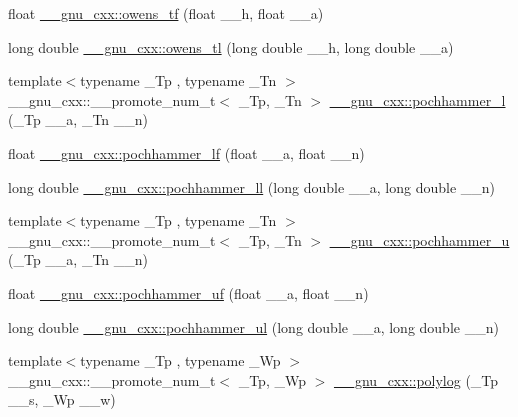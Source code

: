 \begin{DoxyCompactItemize}
\item 
float \hyperlink{group__gnu__math__spec__func_gac24d32e9b072c4953654d5559f992871}{\+\_\+\+\_\+gnu\+\_\+cxx\+::owens\+\_\+tf} (float \+\_\+\+\_\+h, float \+\_\+\+\_\+a)
\item 
long double \hyperlink{group__gnu__math__spec__func_ga7a8bc60dc0ef4a009586872eb7cac2d0}{\+\_\+\+\_\+gnu\+\_\+cxx\+::owens\+\_\+tl} (long double \+\_\+\+\_\+h, long double \+\_\+\+\_\+a)
\item 
{\footnotesize template$<$typename \+\_\+\+Tp , typename \+\_\+\+Tn $>$ }\\\+\_\+\+\_\+gnu\+\_\+cxx\+::\+\_\+\+\_\+promote\+\_\+num\+\_\+t$<$ \+\_\+\+Tp, \+\_\+\+Tn $>$ \hyperlink{group__gnu__math__spec__func_gafed029416c3c440fea35a3a135991436}{\+\_\+\+\_\+gnu\+\_\+cxx\+::pochhammer\+\_\+l} (\+\_\+\+Tp \+\_\+\+\_\+a, \+\_\+\+Tn \+\_\+\+\_\+n)
\item 
float \hyperlink{group__gnu__math__spec__func_ga66c7ea176dad7f06f19cc80e860f333c}{\+\_\+\+\_\+gnu\+\_\+cxx\+::pochhammer\+\_\+lf} (float \+\_\+\+\_\+a, float \+\_\+\+\_\+n)
\item 
long double \hyperlink{group__gnu__math__spec__func_gadec5630d81fc1d3f6f61146a2d16fafc}{\+\_\+\+\_\+gnu\+\_\+cxx\+::pochhammer\+\_\+ll} (long double \+\_\+\+\_\+a, long double \+\_\+\+\_\+n)
\item 
{\footnotesize template$<$typename \+\_\+\+Tp , typename \+\_\+\+Tn $>$ }\\\+\_\+\+\_\+gnu\+\_\+cxx\+::\+\_\+\+\_\+promote\+\_\+num\+\_\+t$<$ \+\_\+\+Tp, \+\_\+\+Tn $>$ \hyperlink{group__gnu__math__spec__func_ga4cadb141501737e85c8d6511fe3d3b94}{\+\_\+\+\_\+gnu\+\_\+cxx\+::pochhammer\+\_\+u} (\+\_\+\+Tp \+\_\+\+\_\+a, \+\_\+\+Tn \+\_\+\+\_\+n)
\item 
float \hyperlink{group__gnu__math__spec__func_ga520a93cbd1963b22679e865f29f36331}{\+\_\+\+\_\+gnu\+\_\+cxx\+::pochhammer\+\_\+uf} (float \+\_\+\+\_\+a, float \+\_\+\+\_\+n)
\item 
long double \hyperlink{group__gnu__math__spec__func_ga169c9e8f9d84e51187a0fe4ecaba0947}{\+\_\+\+\_\+gnu\+\_\+cxx\+::pochhammer\+\_\+ul} (long double \+\_\+\+\_\+a, long double \+\_\+\+\_\+n)
\item 
{\footnotesize template$<$typename \+\_\+\+Tp , typename \+\_\+\+Wp $>$ }\\\+\_\+\+\_\+gnu\+\_\+cxx\+::\+\_\+\+\_\+promote\+\_\+num\+\_\+t$<$ \+\_\+\+Tp, \+\_\+\+Wp $>$ \hyperlink{group__gnu__math__spec__func_ga49da0ff03584a0bbc64f925a550537d3}{\+\_\+\+\_\+gnu\+\_\+cxx\+::polylog} (\+\_\+\+Tp \+\_\+\+\_\+s, \+\_\+\+Wp \+\_\+\+\_\+w)

\end{DoxyCompactItemize}

